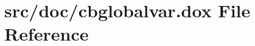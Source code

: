 \hypertarget{cbglobalvar_8dox}{\section{src/doc/cbglobalvar.dox File Reference}
\label{cbglobalvar_8dox}
}
